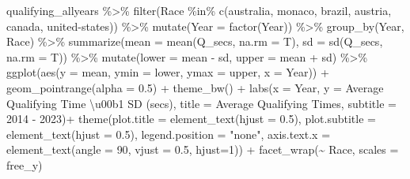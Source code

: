 \documentclass[
]{book}
\newenvironment{Shaded}{\begin{snugshade}}{\end{snugshade}}
\newcommand{\AttributeTok}[1]{\textcolor[rgb]{0.77,0.63,0.00}{#1}}
\newcommand{\DecValTok}[1]{\textcolor[rgb]{0.00,0.00,0.81}{#1}}
\newcommand{\FloatTok}[1]{\textcolor[rgb]{0.00,0.00,0.81}{#1}}
\newcommand{\FunctionTok}[1]{\textcolor[rgb]{0.00,0.00,0.00}{#1}}
\newcommand{\NormalTok}[1]{#1}
\newcommand{\SpecialCharTok}[1]{\textcolor[rgb]{0.00,0.00,0.00}{#1}}
\newcommand{\StringTok}[1]{\textcolor[rgb]{0.31,0.60,0.02}{#1}}
\begin{document}
\begin{Shaded}
\begin{Highlighting}[]
\NormalTok{qualifying\_allyears }\SpecialCharTok{\%\textgreater{}\%}
  \FunctionTok{filter}\NormalTok{(Race }\SpecialCharTok{\%in\%} \FunctionTok{c}\NormalTok{(}\StringTok{\textquotesingle{}australia\textquotesingle{}}\NormalTok{, }\StringTok{\textquotesingle{}monaco\textquotesingle{}}\NormalTok{, }\StringTok{\textquotesingle{}brazil\textquotesingle{}}\NormalTok{, }\StringTok{\textquotesingle{}austria\textquotesingle{}}\NormalTok{, }\StringTok{\textquotesingle{}canada\textquotesingle{}}\NormalTok{, }\StringTok{\textquotesingle{}united{-}states\textquotesingle{}}\NormalTok{)) }\SpecialCharTok{\%\textgreater{}\%} 
  \FunctionTok{mutate}\NormalTok{(}\AttributeTok{Year =} \FunctionTok{factor}\NormalTok{(Year)) }\SpecialCharTok{\%\textgreater{}\%}
  \FunctionTok{group\_by}\NormalTok{(Year, Race) }\SpecialCharTok{\%\textgreater{}\%}
  \FunctionTok{summarize}\NormalTok{(}\AttributeTok{mean =} \FunctionTok{mean}\NormalTok{(Q\_secs, }\AttributeTok{na.rm =}\NormalTok{ T),}
            \AttributeTok{sd =} \FunctionTok{sd}\NormalTok{(Q\_secs, }\AttributeTok{na.rm =}\NormalTok{ T)) }\SpecialCharTok{\%\textgreater{}\%} 
  \FunctionTok{mutate}\NormalTok{(}\AttributeTok{lower =}\NormalTok{ mean  }\SpecialCharTok{{-}}\NormalTok{ sd,}
         \AttributeTok{upper =}\NormalTok{ mean }\SpecialCharTok{+}\NormalTok{ sd) }\SpecialCharTok{\%\textgreater{}\%} 
  \FunctionTok{ggplot}\NormalTok{(}\FunctionTok{aes}\NormalTok{(}\AttributeTok{y =}\NormalTok{ mean, }\AttributeTok{ymin =}\NormalTok{ lower, }\AttributeTok{ymax =}\NormalTok{ upper, }\AttributeTok{x =}\NormalTok{ Year)) }\SpecialCharTok{+}
  \FunctionTok{geom\_pointrange}\NormalTok{(}\AttributeTok{alpha =} \FloatTok{0.5}\NormalTok{) }\SpecialCharTok{+}
  \FunctionTok{theme\_bw}\NormalTok{() }\SpecialCharTok{+}
  \FunctionTok{labs}\NormalTok{(}\AttributeTok{x =} \StringTok{\textquotesingle{}Year\textquotesingle{}}\NormalTok{,}
       \AttributeTok{y =} \StringTok{\textquotesingle{}Average Qualifying Time \textbackslash{}u00b1 SD (secs)\textquotesingle{}}\NormalTok{,}
       \AttributeTok{title =} \StringTok{\textquotesingle{}Average Qualifying Times\textquotesingle{}}\NormalTok{,}
       \AttributeTok{subtitle =} \StringTok{\textquotesingle{}2014 {-} 2023\textquotesingle{}}\NormalTok{)}\SpecialCharTok{+}
  \FunctionTok{theme}\NormalTok{(}\AttributeTok{plot.title =} \FunctionTok{element\_text}\NormalTok{(}\AttributeTok{hjust =} \FloatTok{0.5}\NormalTok{),}
        \AttributeTok{plot.subtitle =} \FunctionTok{element\_text}\NormalTok{(}\AttributeTok{hjust =} \FloatTok{0.5}\NormalTok{),}
        \AttributeTok{legend.position =} \StringTok{"none"}\NormalTok{,}
        \AttributeTok{axis.text.x =} \FunctionTok{element\_text}\NormalTok{(}\AttributeTok{angle =} \DecValTok{90}\NormalTok{, }\AttributeTok{vjust =} \FloatTok{0.5}\NormalTok{, }\AttributeTok{hjust=}\DecValTok{1}\NormalTok{)) }\SpecialCharTok{+}
  \FunctionTok{facet\_wrap}\NormalTok{(}\SpecialCharTok{\textasciitilde{}}\NormalTok{ Race, }\AttributeTok{scales =} \StringTok{\textquotesingle{}free\_y\textquotesingle{}}\NormalTok{)}
\end{Highlighting}
\end{Shaded}
\end{document}
